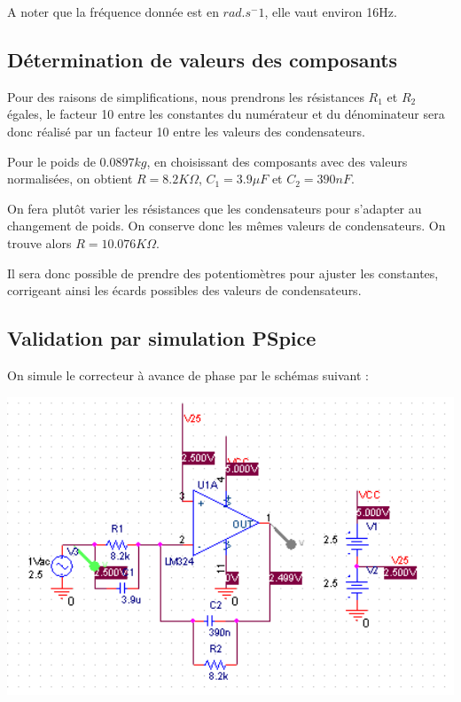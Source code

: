 \documentclass[11pt, french]{article} %
\begin{document}
A noter que la fréquence donnée est en $rad.s^-1$, elle vaut environ 16Hz. 
\subsection{Détermination de valeurs des composants}

Pour des raisons de simplifications, nous prendrons les résistances $R_1$ et $R_2$ égales, le facteur 10 entre les constantes du numérateur et du dénominateur sera donc réalisé par un facteur 10 entre les valeurs des condensateurs. 



Pour le poids de $0.0897 kg$, en choisissant des composants avec des valeurs normalisées, on obtient $R=8.2 K\Omega$, $C_1=3.9 \mu F$ et $C_2=390 nF$. 



On fera plutôt varier les résistances que les condensateurs pour s'adapter au changement de poids. On conserve donc les mêmes valeurs de condensateurs. On trouve alors $R=10.076 K\Omega$. 



Il sera donc possible de prendre des potentiomètres pour ajuster les constantes, corrigeant ainsi les écards possibles des valeurs de condensateurs. 


\subsection{Validation par simulation PSpice}

On simule le correcteur à avance de phase par le schémas suivant : 

\begin{center}
\includegraphics[width = 15cm]{SolutionAnalogique/schAvph.png} 
\end{center}
\end{document}
